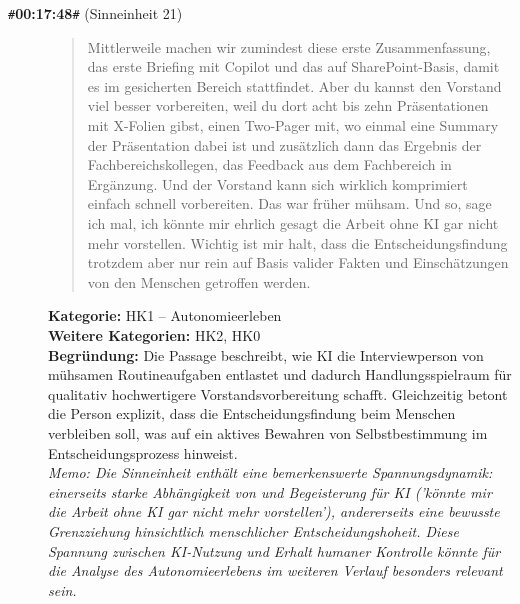 \begin{description}
  \item[\texttt{\#}\textbf{00:17:48}\texttt{\#} (Sinneinheit 21)]
  \begin{quote}
  Mittlerweile machen wir zumindest diese erste Zusammenfassung, das erste Briefing mit Copilot und das auf SharePoint-Basis, damit es im gesicherten Bereich stattfindet. Aber du kannst den Vorstand viel besser vorbereiten, weil du dort acht bis zehn Präsentationen mit X-Folien gibst, einen Two-Pager mit, wo einmal eine Summary der Präsentation dabei ist und zusätzlich dann das Ergebnis der Fachbereichskollegen, das Feedback aus dem Fachbereich in Ergänzung. Und der Vorstand kann sich wirklich komprimiert einfach schnell vorbereiten. Das war früher mühsam. Und so, sage ich mal, ich könnte mir ehrlich gesagt die Arbeit ohne KI gar nicht mehr vorstellen. Wichtig ist mir halt, dass die Entscheidungsfindung trotzdem aber nur rein auf Basis valider Fakten und Einschätzungen von den Menschen getroffen werden.
  \end{quote}
  \textbf{Kategorie:} HK1 -- Autonomieerleben\\
  \textbf{Weitere Kategorien:} HK2, HK0\\
  \textbf{Begr\"undung:} Die Passage beschreibt, wie KI die Interviewperson von mühsamen Routineaufgaben entlastet und dadurch Handlungsspielraum für qualitativ hochwertigere Vorstandsvorbereitung schafft. Gleichzeitig betont die Person explizit, dass die Entscheidungsfindung beim Menschen verbleiben soll, was auf ein aktives Bewahren von Selbstbestimmung im Entscheidungsprozess hinweist.
  \\\textit{Memo: Die Sinneinheit enthält eine bemerkenswerte Spannungsdynamik: einerseits starke Abhängigkeit von und Begeisterung für KI ('könnte mir die Arbeit ohne KI gar nicht mehr vorstellen'), andererseits eine bewusste Grenzziehung hinsichtlich menschlicher Entscheidungshoheit. Diese Spannung zwischen KI-Nutzung und Erhalt humaner Kontrolle könnte für die Analyse des Autonomieerlebens im weiteren Verlauf besonders relevant sein.}
\end{description}
\medskip

